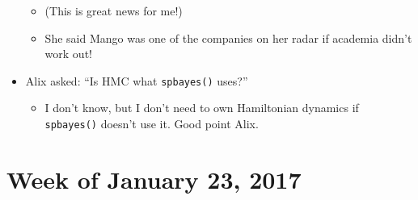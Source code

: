 \documentclass{article}
\begin{document}
\begin{itemize}
\begin{itemize}
        \item (This is great news for me!) 
        \item She said Mango was one of the companies on her radar if academia didn't work out!
        \end{itemize}
\item Alix asked: ``Is HMC what \verb|spbayes()| uses?'' 
        \begin{itemize}
        \item I don't know, but I don't need to own Hamiltonian dynamics if \verb|spbayes()| doesn't use it. Good point Alix. 
        \end{itemize}
\end{itemize}


\section*{Week of January 23, 2017} %
\end{document}
